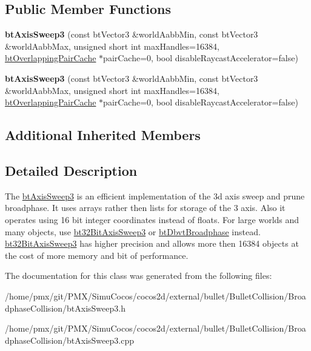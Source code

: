 \subsection*{Public Member Functions}
\begin{DoxyCompactItemize}
\item 
\mbox{\label{classbtAxisSweep3_a7ccf0dc666f9a5506c309dc0359c2f09}} 
{\bfseries bt\+Axis\+Sweep3} (const bt\+Vector3 \&world\+Aabb\+Min, const bt\+Vector3 \&world\+Aabb\+Max, unsigned short int max\+Handles=16384, \hyperlink{classbtOverlappingPairCache}{bt\+Overlapping\+Pair\+Cache} $\ast$pair\+Cache=0, bool disable\+Raycast\+Accelerator=false)
\item 
\mbox{\label{classbtAxisSweep3_a7ccf0dc666f9a5506c309dc0359c2f09}} 
{\bfseries bt\+Axis\+Sweep3} (const bt\+Vector3 \&world\+Aabb\+Min, const bt\+Vector3 \&world\+Aabb\+Max, unsigned short int max\+Handles=16384, \hyperlink{classbtOverlappingPairCache}{bt\+Overlapping\+Pair\+Cache} $\ast$pair\+Cache=0, bool disable\+Raycast\+Accelerator=false)
\end{DoxyCompactItemize}
\subsection*{Additional Inherited Members}


\subsection{Detailed Description}
The \hyperlink{classbtAxisSweep3}{bt\+Axis\+Sweep3} is an efficient implementation of the 3d axis sweep and prune broadphase. It uses arrays rather then lists for storage of the 3 axis. Also it operates using 16 bit integer coordinates instead of floats. For large worlds and many objects, use \hyperlink{classbt32BitAxisSweep3}{bt32\+Bit\+Axis\+Sweep3} or \hyperlink{structbtDbvtBroadphase}{bt\+Dbvt\+Broadphase} instead. \hyperlink{classbt32BitAxisSweep3}{bt32\+Bit\+Axis\+Sweep3} has higher precision and allows more then 16384 objects at the cost of more memory and bit of performance. 

The documentation for this class was generated from the following files\+:\begin{DoxyCompactItemize}
\item 
/home/pmx/git/\+P\+M\+X/\+Simu\+Cocos/cocos2d/external/bullet/\+Bullet\+Collision/\+Broadphase\+Collision/bt\+Axis\+Sweep3.\+h\item 
/home/pmx/git/\+P\+M\+X/\+Simu\+Cocos/cocos2d/external/bullet/\+Bullet\+Collision/\+Broadphase\+Collision/bt\+Axis\+Sweep3.\+cpp\end{DoxyCompactItemize}

